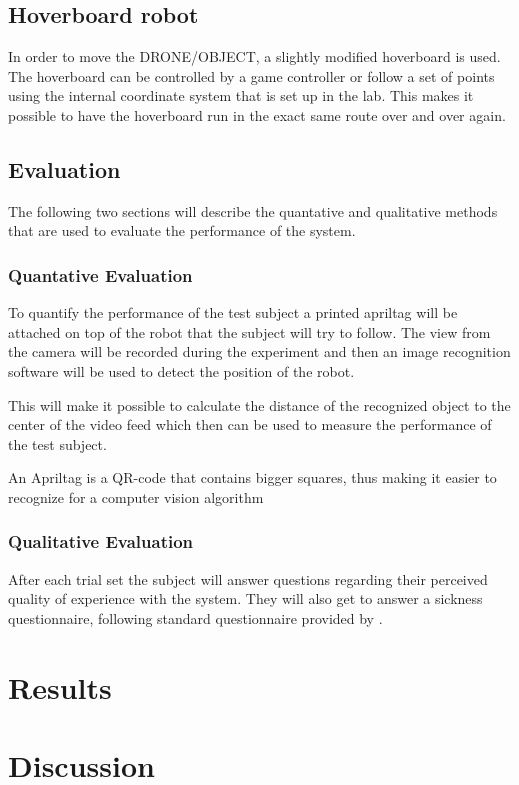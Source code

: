 \documentclass[nofilelist]{cslthse-msc}
\begin{document}
\section{Hoverboard robot}
In order to move the DRONE/OBJECT, a slightly modified hoverboard is used. The hoverboard can be controlled by a game controller or follow a set of points using the internal coordinate system that is set up in the lab. This makes it possible to have the hoverboard run in the exact same route over and over again. 

\section{Evaluation}
The following two sections will describe the quantative and qualitative methods that are used to evaluate the performance of the system. 

\subsection{Quantative Evaluation}
To quantify the performance of the test subject a printed apriltag will be attached on top of the robot that the subject will try to follow. The view from the camera will be recorded during the experiment and then an image recognition software will be used to detect the position of the robot. 

This will make it possible to calculate the distance of the recognized object to the center of the video feed which then can be used to measure the performance of the test subject.

An Apriltag is a QR-code that contains bigger squares, thus making it easier to recognize for a computer vision algorithm

\subsection{Qualitative Evaluation}
After each trial set the subject will answer questions regarding their perceived quality of experience with the system. They will also get to answer a sickness questionnaire, following standard questionnaire provided by \cite{SICKNESSQ}.

\chapter{Results}

\chapter{Discussion}
\end{document}
